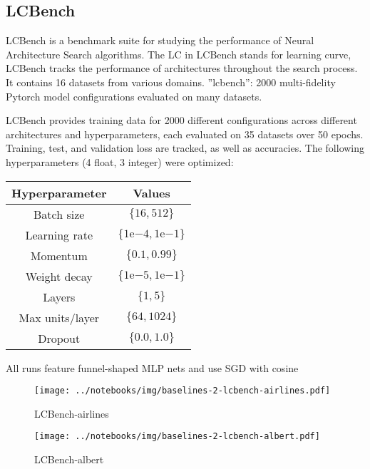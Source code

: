 \subsection{LCBench}
LCBench is a benchmark suite for studying the performance of Neural Architecture Search algorithms. The LC in LCBench stands for learning curve, LCBench tracks the performance of architectures throughout the search process. It contains 16 datasets from various domains.
”lcbench”: 2000 multi-fidelity Pytorch model configurations evaluated on many datasets.

LCBench provides training data for 2000 different configurations across different architectures and hyperparameters, each evaluated on 35 datasets over 50 epochs. Training, test, and validation loss are tracked, as well as accuracies. The following hyperparameters (4 float, 3 integer) were optimized:

\begin{table}
    \centering
\begin{tabular}{cc}
    \textbf{Hyperparameter} & \textbf{Values} \\ \midrule
    Batch size & $\{16, 512\}$ \\
    Learning rate & $\{1\mathrm{e}{-4}, 1\mathrm{e}{-1}\}$ \\
    Momentum & $\{0.1, 0.99\}$ \\
    Weight decay & $\{1\mathrm{e}{-5}, 1\mathrm{e}{-1}\}$ \\
    Layers & $\{1, 5\}$ \\
    Max units/layer & $\{64, 1024\}$ \\
    Dropout & $\{0.0, 1.0\}$
    \end{tabular}
\end{table}

All runs feature funnel-shaped MLP nets and use SGD with cosine
\begin{figure}[H]
    \centering
    \texttt{[image: ../notebooks/img/baselines-2-lcbench-airlines.pdf]}
    \caption{LCBench-airlines}
\end{figure}

\begin{figure}[H]
    \centering
    \texttt{[image: ../notebooks/img/baselines-2-lcbench-albert.pdf]}
    \caption{LCBench-albert}
\end{figure}

